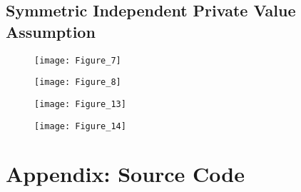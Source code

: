\documentclass{article}
\begin{document}
\newpage

\subsection{Symmetric Independent Private Value Assumption}

\begin{figure}[h]
  \centering
    \texttt{[image: Figure\_7]}
\end{figure}
\FloatBarrier

\begin{figure}[h]
  \centering
    \texttt{[image: Figure\_8]}
\end{figure}
\FloatBarrier

\begin{figure}[h]
  \centering
    \texttt{[image: Figure\_13]}
\end{figure}
\FloatBarrier

\begin{figure}[h]
  \centering
    \texttt{[image: Figure\_14]}
\end{figure}
\FloatBarrier

\newpage

\section{Appendix: Source Code}
\end{document}
